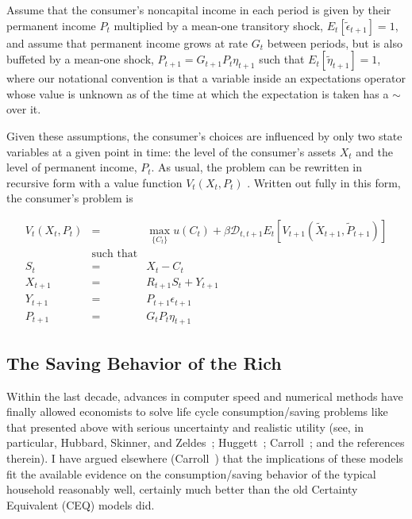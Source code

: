 \documentclass[12pt]{article}
\begin{document}
Assume that the consumer's noncapital income in each period is given by
their permanent income $P_{t}$ multiplied by a mean-one transitory shock, $%
E_{t}[\tilde{\epsilon}_{t+1}] = 1$, and assume that permanent income grows
at rate $G_{t}$ between periods, but is also buffeted by a mean-one shock, $%
P_{t+1} = G_{t+1}P_{t}\eta_{t+1}$ such that $E_{t} [\tilde{\eta}_{t+1}]=1$,
where our notational convention is that a variable inside an expectations
operator whose value is unknown as of the time at which the expectation is
taken has a $\sim$ over it.

Given these assumptions, the consumer's choices are influenced by only two
state variables at a given point in time: the level of the consumer's assets 
$X_{t}$ and the level of permanent income, $P_{t}$. As usual, the problem
can be rewritten in recursive form with a value function $V_{t}(X_{t},P_{t})$%
. Written out fully in this form, the consumer's problem is

\begin{eqnarray}
V_{t}(X_{t},P_{t}) & =& \max_{\{C_{t}\}} u(C_{t}) + \beta \mathcal{D}%
_{t,t+1} E_{t}\left[V_{t+1}(\tilde{X}_{t+1},\tilde{P}_{t+1}) \right] 
\nonumber \\
& \mbox{such that} &  \label{eq:bellmanstd} \\
S_{t} & = & X_{t}-C_{t}  \nonumber \\
X_{t+1} & = & R_{t+1}S_{t} + Y_{t+1}  \nonumber \\
Y_{t+1} & = & P_{t+1}\epsilon_{t+1}  \nonumber \\
P_{t+1} & = & G_{t} P_{t} \eta_{t+1}  \nonumber
\end{eqnarray}

\subsection{The Saving Behavior of the Rich}

Within the last decade, advances in computer speed and numerical methods
have finally allowed economists to solve life cycle consumption/saving
problems like that presented above with serious uncertainty and realistic
utility (see, in particular, Hubbard, Skinner, and Zeldes~\cite
{hsz:importance}; Huggett~\cite{huggett:wealth}; Carroll~\cite
{carroll:bslcpih}; and the references therein). I have argued elsewhere
(Carroll~\cite{carroll:bslcpih}) that the implications of these models fit
the available evidence on the consumption/saving behavior of the typical
household reasonably well, certainly much better than the old Certainty
Equivalent (CEQ) models did.
\end{document}
